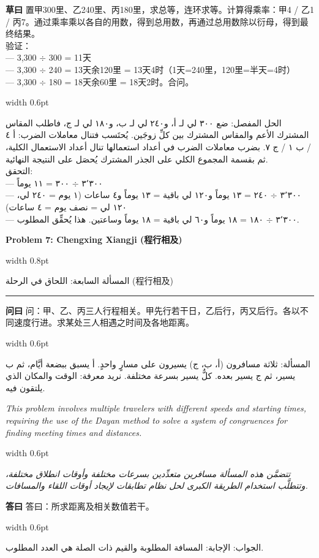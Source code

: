 \documentclass[11pt,a4paper]{article}
\newlength{\cnwidth}
\newlength{\arwidth}
\newcommand{\paralleltext}[2]{%
  \par\medskip\noindent
  \begin{minipage}[t]{\cnwidth}%
    \small #1%
  \end{minipage}%
  \hfill\textcolor{colrule}{\vrule width 0.6pt}\hfill
  \begin{minipage}[t]{\arwidth}%
    \small\arabicfont\beginR #2\endR%
  \end{minipage}%
  \par\medskip
}
\newcommand{\parallelsection}[2]{%
  \par\bigskip\noindent
  \begin{minipage}[t]{\cnwidth}%
    \Large\bfseries\color{sectioncolor} #1%
  \end{minipage}%
  \hfill\textcolor{colrule}{\vrule width 0.8pt}\hfill
  \begin{minipage}[t]{\arwidth}%
    \Large\arabicfontbf\color{sectioncolor}\beginR #2\endR%
  \end{minipage}%
  \par\medskip\noindent\textcolor{colrule}{\rule{\textwidth}{0.6pt}}\par\medskip
}
\newcommand{\cnlabel}[1]{\textbf{\color{notecolor}#1}}
\newcommand{\arlabel}[1]{\arabicfontbf\color{notecolor}\beginR #1\endR}
\begin{document}
\paralleltext{%
\cnlabel{草曰} 置甲300里、乙240里、丙180里，求总等，连环求等。计算得乘率：甲4 / 乙1 / 丙7。通过乘率乘以各自的用数，得到总用数，再通过总用数除以衍母，得到最终结果。\\
验证：\\
--- 3,300 $\div$ 300 = 11天\\
--- 3,300 $\div$ 240 = 13天余120里 = 13天4时（1天=240里，120里=半天=4时）\\
--- 3,300 $\div$ 180 = 18天余60里 = 18天2时。合问。%
}{%
\arlabel{الحل المفصل:} ضع ٣٠٠ لي لـ أ، و٢٤٠ لي لـ ب، و١٨٠ لي لـ ج، فاطلب المقاس المشترك الأعم والمقاس المشترك بين كلِّ زوجَين. يُحتَسب فتنال معاملات الضرب: أ ٤ / ب ١ / ج ٧. بضرب معاملات الضرب في أعداد استعمالها تنال أعداد الاستعمال الكلية، ثم بقسمة المجموع الكلي على الجذر المشترك يُحصَل على النتيجة النهائية.\\
التحقق:\\
--- ٣٬٣٠٠ $\div$ ٣٠٠ = ١١ يوماً\\
--- ٣٬٣٠٠ $\div$ ٢٤٠ = ١٣ يوماً و١٢٠ لي باقية = ١٣ يوماً و٤ ساعات (١ يوم = ٢٤٠ لي، ١٢٠ لي = نصف يوم = ٤ ساعات)\\
--- ٣٬٣٠٠ $\div$ ١٨٠ = ١٨ يوماً و٦٠ لي باقية = ١٨ يوماً وساعتين. هذا يُحقِّق المطلوب.
}

\newpage

\parallelsection{Problem 7: Chengxing Xiangji (程行相及)}{المسألة السابعة: اللحاق في الرحلة (程行相及)}

\paralleltext{%
\cnlabel{问曰} 问：甲、乙、丙三人行程相关。甲先行若干日，乙后行，丙又后行。各以不同速度行进。求某处三人相遇之时间及各地距离。%
}{%
\arlabel{المسألة:} ثلاثة مسافرون (أ، ب، ج) يسيرون على مسارٍ واحدٍ. أ يسبق ببضعة أيَّام، ثم ب يسير، ثم ج يسير بعده. كلٌّ يسير بسرعة مختلفة. نريد معرفة: الوقت والمكان الذي يلتقون فيه.
}

\paralleltext{%
\textit{This problem involves multiple travelers with different speeds and starting times, requiring the use of the Dayan method to solve a system of congruences for finding meeting times and distances.}%
}{%
\textit{تتضمَّن هذه المسألة مسافرين متعدِّدين بسرعات مختلفة وأوقات انطلاق مختلفة، وتتطلَّب استخدام الطريقة الكبرى لحل نظام تطابقات لإيجاد أوقات اللقاء والمسافات.}
}

\paralleltext{%
\cnlabel{答曰} 答曰：所求距离及相关数值若干。%
}{%
\arlabel{الجواب:} الإجابة: المسافة المطلوبة والقيم ذات الصلة هي العدد المطلوب.
}
\end{document}
